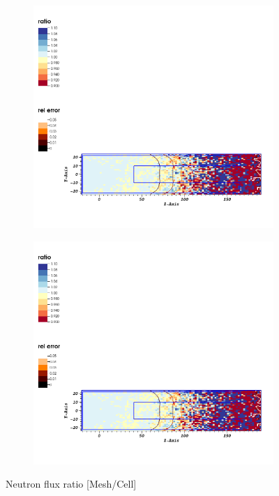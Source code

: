 \begin{figure}
\begin{subfigure}{0.1\textwidth}
        \includegraphics[scale=0.35, trim={0cm 6.1cm 32cm 15cm}, clip]{figs/ratio_nflux_larger.png}
    \end{subfigure}
    \begin{subfigure}{0.79\textwidth}
        \centering
        \includegraphics[scale=0.5, trim={4cm 2cm 1cm 22cm}, clip]{figs/ratio_nflux_larger.png}
    \end{subfigure}
    \caption{Neutron flux ratio [Mesh/Cell]}
    \label{fig:n_ratio_larger}
\end{figure}

